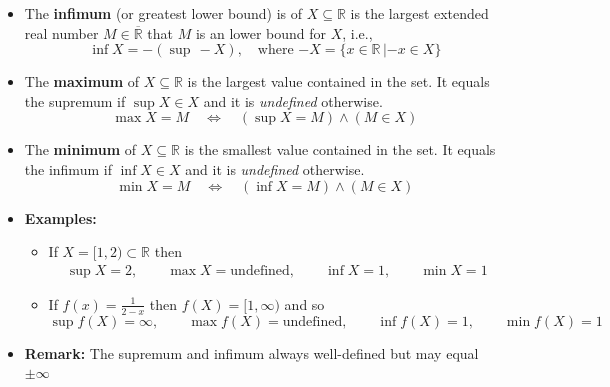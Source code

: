 \documentclass[11pt,twoside]{report}
\newcommand{\bbR}{{\mathbb{R}}}
\begin{document}
\begin{itemize}
 
 \item The \textbf{infimum} (or greatest lower bound)  is of $X\subseteq \bbR$ is the  largest extended real number $M \in \overline{\bbR}$ that $M$ is an lower bound for $X$, i.e., 
\[
\inf X = - \left(\sup \, -\!X\right), \quad \text{where $-\!X = \{x\in \mathbb{R}\,|-\!x\in X\}$}
\]
 


\item %
 The \textbf{maximum} of $X\subseteq \bbR$ is the largest value contained in the set.
It equals the supremum if $\sup X \in X$ and it is \emph{undefined} otherwise.
\[
\max X = M \quad \iff \quad  (\sup X =  M) \wedge (M \in X)
\]


\item %
 The \textbf{minimum} of $X\subseteq \bbR$ is the smallest value contained in the set.
It equals the infimum if $\inf X \in X$ and it is \emph{undefined} otherwise.
\[
\min X = M \quad \iff \quad  (\inf X =  M) \wedge (M \in X)
\]



\item \textbf{Examples:} 
\begin{itemize}
\item If $X = [1,2) \subset \mathbb{R}$ then
\begin{align*}
\sup X = 2, \qquad \max X = \text{undefined}, \qquad \inf X = 1, \qquad \min X = 1
\end{align*}
%
\item If $f(x)=\frac{1}{2-x}$ then $f(X) = [1, \infty)$ and so 
\[
\sup f(X) = \infty, \qquad \max f(X) = \text{undefined}, \qquad \inf f(X) = 1, \qquad \min f(X) = 1
\]
\end{itemize}

\item \textbf{Remark:} The supremum and infimum always well-defined but may equal $\pm \infty$



\end{itemize}
\end{document}
